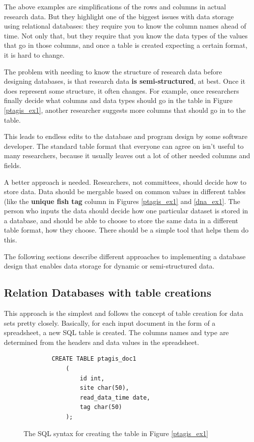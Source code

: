 The above examples are simplifications of the rows and columns in actual research 
data. But they highlight one of the biggest issues with data storage using relational
databases: they require you to know the column names ahead of time. Not only that,
but they require that you know the data types of the values that go in those columns,
and once a table is created expecting a certain format, it is hard to change.

The problem with needing to know the structure of research data before designing
databases, is that research data \textbf{is semi-structured}, at best. Once it does
represent some structure, it often changes. For example, once researchers finally 
decide what columns and data types should go in the table in Figure \ref{ptagis_ex1},
another researcher suggests more columns that should go in to the table.

This leads to endless edits to the database and program design by some software 
developer. The standard table format that everyone can agree on isn't useful to many
researchers, because it usually leaves out a lot of other needed columns and fields.

A better approach is needed. Researchers, not committees, should decide how to store 
data. Data should be mergable based on common values in different tables (like the 
\textbf{unique fish tag} column in Figures \ref{ptagis_ex1} and \ref{dna_ex1}. The 
person who inputs the data should decide how one particular dataset is stored in a 
database, and should be able to choose to store the same data in a different table 
format, how they choose. There should be a simple tool that helps them do this.

The following sections describe different approaches to implementing a database design
that enables data storage for dynamic or semi-structured data.


\subsection{Relation Databases with table creations}
This approach is the simplest and follows the concept of table creation for data sets
pretty closely. Basically, for each input document in the form of a spreadsheet, a new
SQL table is created. The columns names and type are determined from the headers and 
data values in the spreadsheet.

\begin{figure}[h]
	\begin{center}
	\begin{lstlisting}
		CREATE TABLE ptagis_doc1
			(
				id int, 
				site char(50), 
				read_data_time date,
				tag char(50)
			); 
	\end{lstlisting}
	\caption{The SQL syntax for creating the table in Figure \ref{ptagis_ex1} } 
	\label{ptagis_ex1_sql}
	\end{center}
\end{figure}

